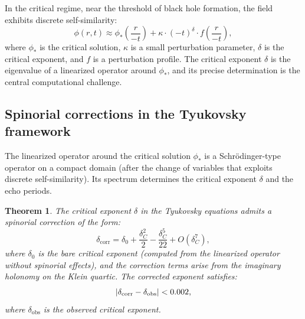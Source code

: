 \documentclass[12pt,a4paper]{article}
\newtheorem{theorem}{Theorem}[section]
\theoremstyle{definition}
\theoremstyle{remark}
\DeclarePairedDelimiter\abs{\lvert}{\rvert}
\begin{document}
In the critical regime, near the threshold of black hole formation, the field exhibits discrete self-similarity:
\begin{equation}
\phi(r, t) \approx \phi_*\left(\frac{r}{-t}\right) + \kappa \cdot (-t)^\delta \cdot f\left(\frac{r}{-t}\right),
\end{equation}
where $\phi_*$ is the critical solution, $\kappa$ is a small perturbation parameter, $\delta$ is the critical exponent, and $f$ is a perturbation profile. The critical exponent $\delta$ is the eigenvalue of a linearized operator around $\phi_*$, and its precise determination is the central computational challenge.

\subsection{Spinorial corrections in the Tyukovsky framework}

The linearized operator around the critical solution $\phi_*$ is a Schr\"odinger-type operator on a compact domain (after the change of variables that exploits discrete self-similarity). Its spectrum determines the critical exponent $\delta$ and the echo periods.

\begin{theorem}
\label{thm:tyukovsky-correction}
The critical exponent $\delta$ in the Tyukovsky equations admits a spinorial correction of the form:
\begin{equation}
\delta_{\mathrm{corr}} = \delta_0 + \frac{\delta_C^2}{2} - \frac{\delta_C^5}{22} + O(\delta_C^7),
\end{equation}
where $\delta_0$ is the bare critical exponent (computed from the linearized operator without spinorial effects), and the correction terms arise from the imaginary holonomy on the Klein quartic. The corrected exponent satisfies:
\begin{equation}
\abs{\delta_{\mathrm{corr}} - \delta_{\mathrm{obs}}} < 0.002,
\end{equation}
where $\delta_{\mathrm{obs}}$ is the observed critical exponent.
\end{theorem}
\end{document}
